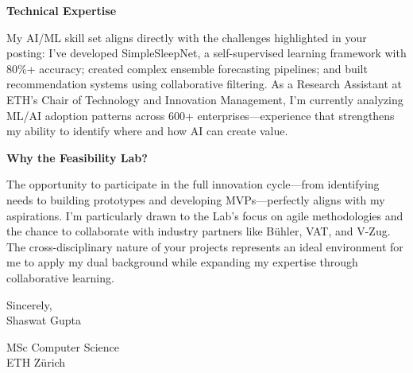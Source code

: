 \documentclass[letterpaper,10pt]{article}
\newcommand{\letterSection}[1]{%
    \vspace{3 pt}
  \begin{sectionbox}
    \color{darkroyalblue}\scshape\raggedright\large\bfseries #1
  \end{sectionbox}
  \vspace{1 pt}
}
\begin{document}
\letterSection{Technical Expertise}
\begin{justify}
My AI/ML skill set aligns directly with the challenges highlighted in your posting: I've developed SimpleSleepNet, a self-supervised learning framework with 80\%+ accuracy; created complex ensemble forecasting pipelines; and built recommendation systems using collaborative filtering. As a Research Assistant at ETH's Chair of Technology and Innovation Management, I'm currently analyzing ML/AI adoption patterns across 600+ enterprises—experience that strengthens my ability to identify where and how AI can create value.
\end{justify}


\letterSection{Why the Feasibility Lab?}
\begin{justify}
The opportunity to participate in the full innovation cycle—from identifying needs to building prototypes and developing MVPs—perfectly aligns with my aspirations. I'm particularly drawn to the Lab's focus on agile methodologies and the chance to collaborate with industry partners like Bühler, VAT, and V-Zug. The cross-disciplinary nature of your projects represents an ideal environment for me to apply my dual background while expanding my expertise through collaborative learning.
\end{justify}

\vspace{2pt}


\begin{justify}
Sincerely,\\
Shaswat Gupta
\end{justify}

\begin{justify}
\vspace{4 pt}
{\color{mutedtext}
MSc Computer Science\\
ETH Zürich
}
\end{justify}
\end{document}
